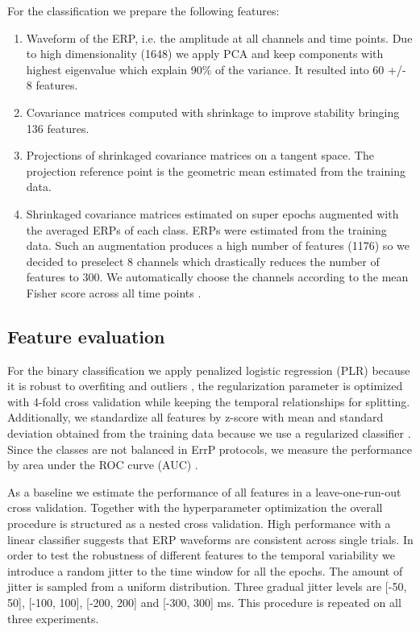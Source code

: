 \documentclass[12pt]{iopart}
\begin{document}
For the classification we prepare the following features:
\begin{enumerate}
    \item Waveform of the ERP, i.e. the amplitude at all channels and time points. Due to high
        dimensionality (1648) we apply PCA and keep components with highest eigenvalue
        which explain 90\% of the variance. It resulted into 60 +/- 8 features.
    \item Covariance matrices computed with shrinkage to improve stability bringing 136 features.
    \item Projections of shrinkaged covariance matrices on a tangent space. The projection reference
        point is the geometric mean estimated from the training data.
    \item Shrinkaged covariance matrices estimated on super epochs augmented with the averaged ERPs
        of each class. ERPs were estimated from the training data.
        Such an augmentation produces
        a high number of features (1176) so we decided to preselect 8 channels which
        drastically reduces the number of features to 300. We automatically choose
        the channels according to the mean Fisher score across all time points \cite{duda_pattern_2001}.
\end{enumerate}

\subsection{Feature evaluation}

For the binary classification we apply penalized logistic
regression (PLR) because it is robust to overfiting and outliers \cite{parra_recipes_2005},
the regularization parameter is optimized with 4-fold cross validation
while keeping the temporal relationships for splitting. 
Additionally, we standardize all features by z-score with mean and standard deviation
obtained from the training data because we use a regularized classifier \cite{hastie_elements_2009}.
Since the classes
are not balanced in ErrP protocols, we measure the performance by area under the ROC curve (AUC) 
\cite{bradley_use_1997}.

As a baseline we estimate the performance of all features in a leave-one-run-out cross validation.
Together with the hyperparameter optimization the overall procedure is structured as
a nested cross validation.
High performance with a linear classifier suggests that ERP waveforms are consistent
across single trials. In order to test the robustness of different features
to the temporal variability we introduce a random jitter to the time window
for all the epochs. The amount of jitter is sampled from a uniform distribution.
Three gradual jitter levels are [-50, 50], [-100, 100], [-200, 200] and [-300, 300] ms.
This procedure is repeated on all three experiments.
\end{document}
